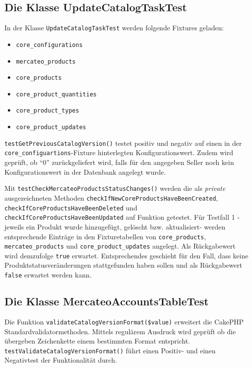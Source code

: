 	\subsection{Die Klasse UpdateCatalogTaskTest}
	
	In der Klasse \texttt{UpdateCatalogTaskTest} werden folgende Fixtures geladen:
	\begin{itemize}[nosep]
		\item \texttt{core\_configurations}
		\item \texttt{mercateo\_products}
		\item \texttt{core\_products}
		\item \texttt{core\_product\_quantities}
		\item \texttt{core\_product\_types}
		\item \texttt{core\_product\_updates}
	\end{itemize}
	\texttt{testGetPreviousCatalogVersion()} testet positiv und negativ auf einen in der \texttt{core\_configuartions}-Fixture hinterlegten Konfigurationswert. Zudem wird geprüft, ob \enquote{0} zurückgeliefert wird, falls für den angegeben Seller noch kein Konfigurationswert in der Datenbank angelegt wurde.
	
	Mit \texttt{testCheckMercateoProductsStatusChanges()} werden die als \textit{private} ausgezeichneten Methoden \texttt{checkIfNewCoreProductsHaveBeenCreated}, 
	\texttt{checkIfCoreProductsHaveBeenDeleted} und
	\texttt{checkIfCoreProductsHaveBeenUpdated} auf Funktion getestet. Für Testfall 1 - jeweils ein Produkt wurde hinzugefügt, gelöscht bzw. aktualisiert- werden entsprechende Einträge in den Fixturetabellen von \texttt{core\_products}, \texttt{mercateo\_products} und \texttt{core\_product\_updates} angelegt. Als Rückgabewert wird demzufolge \texttt{true} erwartet. Entsprechendes geschieht für den Fall, dass keine Produktstatusveränderungen stattgefunden haben sollen und als Rückgabewert \texttt{false} erwartet werden kann.
	
	\subsection{Die Klasse MercateoAccountsTableTest}
	
	Die Funktion \texttt{validateCatalogVersionFormat(\$value)} erweitert die CakePHP Standardvalidatormethoden. Mittels regulärem Ausdruck wird geprüft ob die übergeben Zeichenkette einem bestimmten Format entspricht. \texttt{testValidateCatalogVersionFormat()} führt einen Positiv- und einen Negativtest der Funktionalität durch. 
	
